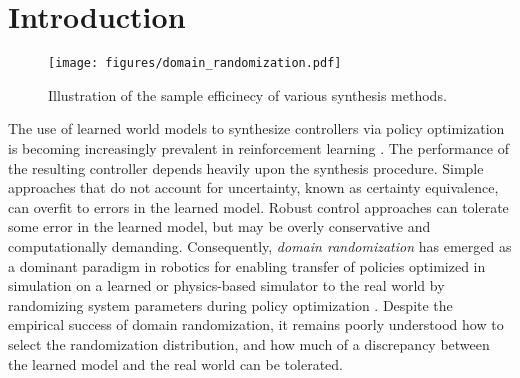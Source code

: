 

\section{Introduction}

\begin{wrapfigure}[12]{r}{0.55\textwidth}
    \centering
    \vspace{-10pt} %
    \texttt{[image: figures/domain\_randomization.pdf]}
    \vspace{-24pt} %
    \caption{Illustration of the sample efficinecy of various synthesis methods. }%
    \label{fig:conceptual figure}
\end{wrapfigure}


The use of learned world models to synthesize controllers via policy optimization is becoming increasingly prevalent in reinforcement learning \citep{wu2023daydreamer, matsuo2022deep}. The performance of the resulting controller depends heavily upon the synthesis procedure. Simple approaches that do not account for uncertainty, known as certainty equivalence, can overfit to errors in the learned model. Robust control approaches can tolerate some error in the learned model, but may be overly conservative and computationally demanding. %
Consequently, \emph{domain randomization} has emerged as a dominant paradigm in robotics for enabling transfer of policies optimized in simulation on a learned or physics-based simulator to the real world by randomizing system parameters during policy optimization \citep{tobin2017dr, akkaya2019solving}. Despite the empirical success of domain randomization, it remains poorly understood how to select the randomization distribution, and how much of a discrepancy between the learned model and the real world can be tolerated. 

